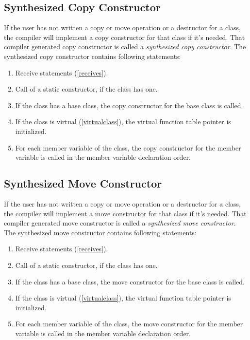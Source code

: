 \documentclass[a4paper,oneside,11pt]{book}
\theoremstyle{definition}
\begin{document}
\subsection{Synthesized Copy Constructor}

If the user has not written a copy or move operation or a destructor for a class, the compiler will implement a copy constructor for that class if it's needed.
That compiler generated copy constructor is called a \emph{synthesized copy constructor}.
The synthesized copy constructor contains following statements:
\begin{enumerate}
\item
Receive statements (\ref{receives}).
\item
Call of a static constructor, if the class has one.
\item
If the class has a base class, the copy constructor for the base class is called.
\item
If the class is virtual (\ref{virtualclass}), the virtual function table pointer is initialized.
\item
For each member variable of the class, the copy constructor for the member variable is called in the member variable declaration order.
\end{enumerate}

\subsection{Synthesized Move Constructor}

If the user has not written a copy or move operation or a destructor for a class, the compiler will implement a move constructor for that class if it's needed.
That compiler generated move constructor is called a \emph{synthesized move constructor}.
The synthesized move constructor contains following statements:
\begin{enumerate}
\item
Receive statements (\ref{receives}).
\item
Call of a static constructor, if the class has one.
\item
If the class has a base class, the move constructor for the base class is called.
\item
If the class is virtual (\ref{virtualclass}), the virtual function table pointer is initialized.
\item
For each member variable of the class, the move constructor for the member variable is called in the member variable declaration order.
\end{enumerate}
\end{document}
